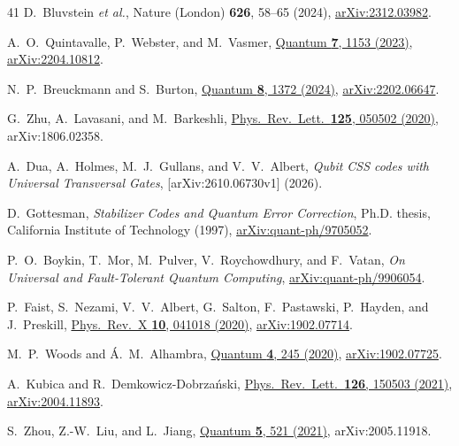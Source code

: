 \documentclass[aps,prl,reprint,notitlepage,nofootinbib,nobibnotes]{revtex4-2}
\begin{document}
\begin{thebibliography}{41}
D.~Bluvstein \emph{et al.},
Nature (London) \textbf{626}, 58--65 (2024),
\href{https://arxiv.org/abs/2312.03982}{arXiv:2312.03982}.

A.~O.~Quintavalle, P.~Webster, and M.~Vasmer,
\href{https://quantum-journal.org/papers/q-2023-10-24-1153/}{Quantum \textbf{7}, 1153 (2023)},
\href{https://arxiv.org/abs/2204.10812}{arXiv:2204.10812}.

N.~P.~Breuckmann and S.~Burton,
\href{https://quantum-journal.org/papers/q-2024-06-13-1372/}{Quantum \textbf{8}, 1372 (2024)},
\href{https://arxiv.org/abs/2202.06647}{arXiv:2202.06647}.

G.~Zhu, A.~Lavasani, and M.~Barkeshli,
\href{https://link.aps.org/doi/10.1103/PhysRevLett.125.050502}{Phys.\ Rev.\ Lett.\ \textbf{125}, 050502 (2020)},
arXiv:1806.02358.

A.~Dua, A.~Holmes, M.~J.~Gullans, and V.~V.~Albert,
\emph{Qubit CSS codes with Universal Transversal Gates},
[arXiv:2610.06730v1] (2026).

D.~Gottesman,
\emph{Stabilizer Codes and Quantum Error Correction},
Ph.D. thesis, California Institute of Technology (1997),
\href{https://arxiv.org/abs/quant-ph/9705052}{arXiv:quant-ph/9705052}.

P.~O.~Boykin, T.~Mor, M.~Pulver, V.~Roychowdhury, and F.~Vatan,
\emph{On Universal and Fault-Tolerant Quantum Computing},
\href{https://arxiv.org/abs/quant-ph/9906054}{arXiv:quant-ph/9906054}.

P.~Faist, S.~Nezami, V.~V.~Albert, G.~Salton, F.~Pastawski,
P.~Hayden, and J.~Preskill,
\href{https://link.aps.org/doi/10.1103/PhysRevX.10.041018}{Phys.\ Rev.\ X \textbf{10}, 041018 (2020)},
\href{https://arxiv.org/abs/1902.07714}{arXiv:1902.07714}.

M.~P.~Woods and \'A.~M.~Alhambra,
\href{https://quantum-journal.org/papers/q-2020-03-23-245/}{Quantum \textbf{4}, 245 (2020)},
\href{https://arxiv.org/abs/1902.07725}{arXiv:1902.07725}.

A.~Kubica and R.~Demkowicz-Dobrza\'nski,
\href{https://link.aps.org/doi/10.1103/PhysRevLett.126.150503}{Phys.\ Rev.\ Lett.\ \textbf{126}, 150503 (2021)},
\href{https://arxiv.org/abs/2004.11893}{arXiv:2004.11893}.

S.~Zhou, Z.-W.~Liu, and L.~Jiang,
\href{https://quantum-journal.org/papers/q-2021-08-09-521/}{Quantum \textbf{5}, 521 (2021)},
arXiv:2005.11918.


\end{thebibliography}
\end{document}
